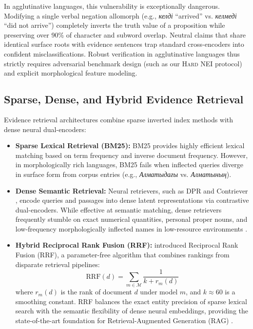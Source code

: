 In agglutinative languages, this vulnerability is exceptionally dangerous. Modifying a single verbal negation allomorph (e.g., \textit{келді} ``arrived'' vs. \textit{келмеді} ``did not arrive'') completely inverts the truth value of a proposition while preserving over 90\% of character and subword overlap. Neutral claims that share identical surface roots with evidence sentences trap standard cross-encoders into confident misclassifications. Robust verification in agglutinative languages thus strictly requires adversarial benchmark design (such as our \textsc{Hard NEI} protocol) and explicit morphological feature modeling.

\subsection{Sparse, Dense, and Hybrid Evidence Retrieval}
Evidence retrieval architectures combine sparse inverted index methods with dense neural dual-encoders:
\begin{itemize}
    \item \textbf{Sparse Lexical Retrieval (BM25):} BM25 \citep{robertson2009bm25} provides highly efficient lexical matching based on term frequency and inverse document frequency. However, in morphologically rich languages, BM25 fails when inflected queries diverge in surface form from corpus entries (e.g., \textit{Алматыдағы} vs. \textit{Алматының}).
    \item \textbf{Dense Semantic Retrieval:} Neural retrievers, such as DPR \citep{karpukhin2020dpr} and Contriever \citep{izacard2021contriever}, encode queries and passages into dense latent representations via contrastive dual-encoders. While effective at semantic matching, dense retrievers frequently stumble on exact numerical quantities, personal proper nouns, and low-frequency morphologically inflected names in low-resource environments \citep{clark2020tydi}.
    \item \textbf{Hybrid Reciprocal Rank Fusion (RRF):} \citet{cormack2009reciprocal} introduced Reciprocal Rank Fusion (RRF), a parameter-free algorithm that combines rankings from disparate retrieval pipelines:
    \begin{equation}
    \label{eq:rrf_formula_relwork}
    \mathrm{RRF}(d) = \sum_{m \in \mathcal{M}} \frac{1}{k + r_m(d)}
    \end{equation}
    where $r_m(d)$ is the rank of document $d$ under model $m$, and $k \approx 60$ is a smoothing constant. RRF balances the exact entity precision of sparse lexical search with the semantic flexibility of dense neural embeddings, providing the state-of-the-art foundation for Retrieval-Augmented Generation (RAG) \citep{lewis2020retrieval}.
\end{itemize}

